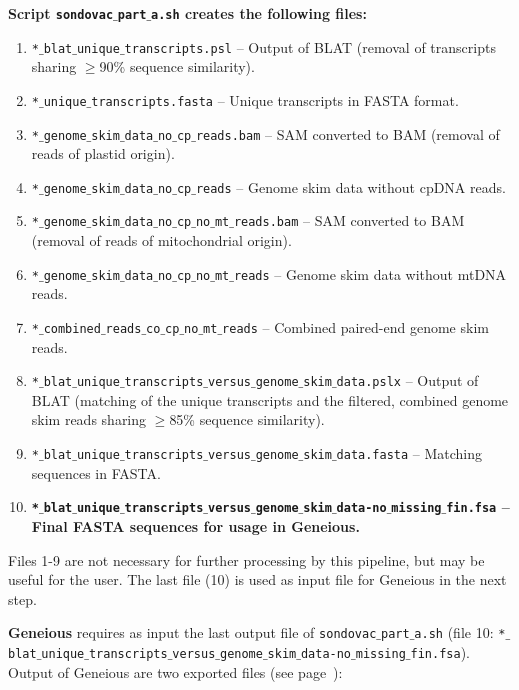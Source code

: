 \documentclass[a4paper, 11pt, twoside]{article}
\begin{document}
\textbf{Script \texttt{sondovac$\_$part$\_$a.sh} creates the following files:}

\begin{enumerate}
  \item \texttt{*$\_$blat$\_$unique$\_$transcripts.psl} -- Output of BLAT (removal of transcripts sharing $\geq$90\% sequence similarity).
  \item \texttt{*$\_$unique$\_$transcripts.fasta} -- Unique transcripts in FASTA format.
  \item \texttt{*$\_$genome$\_$skim$\_$data$\_$no$\_$cp$\_$reads.bam} -- SAM converted to BAM (removal of reads of plastid origin).
  \item \texttt{*$\_$genome$\_$skim$\_$data$\_$no$\_$cp$\_$reads} -- Genome skim data without cpDNA reads.
  \item \texttt{*$\_$genome$\_$skim$\_$data$\_$no$\_$cp$\_$no$\_$mt$\_$reads.bam} -- SAM converted to BAM (removal of reads of mitochondrial origin).
  \item \texttt{*$\_$genome$\_$skim$\_$data$\_$no$\_$cp$\_$no$\_$mt$\_$reads} -- Genome skim data without mtDNA reads.
  \item \texttt{*$\_$combined$\_$reads$\_$co$\_$cp$\_$no$\_$mt$\_$reads} -- Combined paired-end genome skim reads.
  \item \texttt{*$\_$blat$\_$unique$\_$transcripts$\_$versus$\_$genome$\_$skim$\_$data.pslx} -- Output of BLAT (matching of the unique transcripts and the filtered, combined genome skim reads sharing $\geq$85\% sequence similarity).
  \item \texttt{*$\_$blat$\_$unique$\_$transcripts$\_$versus$\_$genome$\_$skim$\_$data.fasta} -- Matching sequences in FASTA.
  \item \textbf{\texttt{*$\_$blat$\_$unique$\_$transcripts$\_$versus$\_$genome$\_$skim$\_$data-no$\_$missing$\_$fin.fsa} -- Final FASTA sequences for usage in Geneious.}
\end{enumerate}

Files 1-9 are not necessary for further processing by this pipeline, but may be useful for the user. The last file (10) is used as input file for Geneious in the next step.

\textbf{Geneious} requires as input the last output file of \texttt{sondovac$\_$part$\_$a.sh} (file 10: \texttt{*$\_$blat$\_$uni\-que$\_$tra\-nscri\-pts$\_$ve\-rsu\-s$\_$ge\-no\-me$\_$skim$\_$data-no$\_$missing$\_$fin.fsa}). Output of Geneious are two exported files (see page~\pageref{geneious}):
\end{document}
